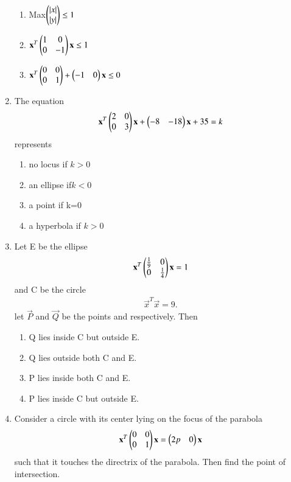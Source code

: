 \begin{enumerate}[label=\arabic*.,ref=\thesubsection.\theenumi]
\begin{enumerate}
    \item Max$\begin{pmatrix}\left\vert x\right\vert \\ \left\vert y\right\vert\end{pmatrix} \leq1$
    \item $\mathbf {x}^T \begin{pmatrix}1&0 \\0 &-1\end{pmatrix}\mathbf {x} \leq1$
    \item $\mathbf {x}^T \begin{pmatrix}0 &0 \\ 0& 1 \end{pmatrix} + \begin{pmatrix}-1& 0\end{pmatrix}\mathbf {x}\leq0$
    \end{enumerate}    
\item The equation 
\begin{align}
\mathbf{x}^T \begin{pmatrix}2&0 \\ 0& 3\end{pmatrix}\mathbf{x} + \begin{pmatrix}-8&-18\end{pmatrix}\mathbf{x}+35=k
\end{align} represents
    \begin{enumerate}
    \item no locus if $k>0$
    \item an ellipse if$k<0$
    \item a point if k=0
    \item a hyperbola if $k>0$
    \end{enumerate}
\item Let E be the ellipse 
\begin{align}
\mathbf {x}^T \begin{pmatrix}\frac{1}{9}&0 \\ 0&\frac{1}{4}\end{pmatrix}\mathbf {x}=1
\end{align} and C be the circle 
\begin{align}
\vec {x}^T \vec {x}=9.
\end{align} let $\vec{P}$ and $\vec{Q}$ be the points   and  respectively. Then
    \begin{enumerate}
    \item Q lies inside C but outside E.
    \item Q lies outside both C and E. 
    \item P lies inside both C and E. 
    \item P lies inside C but outside E.
    \end{enumerate}
\item Consider a circle with its center lying on the focus of the parabola 
	\begin{align}
	\mathbf {x}^T \begin{pmatrix}0&0 \\ 0&1\end{pmatrix}\mathbf {x}=\begin{pmatrix}2p&0\end{pmatrix}\mathbf{x}
	\end{align}
	such that it touches the directrix of the parabola. Then find the point of intersection.

\end{enumerate}
